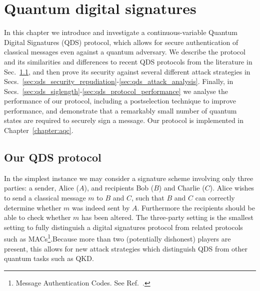 %

\chapter{Quantum digital signatures}


In this chapter we introduce and investigate a continuous-variable Quantum Digital Signatures (QDS) protocol, which allows for secure authentication of classical messages even against a quantum adversary. We describe the protocol and its similarities and differences to recent QDS protocols from the literature in Sec.~\ref{sec:qds_protocol}, and then prove its security against several different attack strategies in Secs.~\ref{sec:qds_security_repudiation}-\ref{sec:qds_attack_analysis}. Finally, in Secs.~\ref{sec:qds_siglength}-\ref{sec:qds_protocol_performance} we analyse the performance of our protocol, including a postselection technique to improve performance, and demonstrate that a remarkably small number of quantum states are required to securely sign a message. Our protocol is implemented in Chapter~\ref{chapter:aqc}.

\section{Our QDS protocol}\label{sec:qds_protocol}

In the simplest instance we may consider a signature scheme involving only three parties: a sender, Alice ($A$), and recipients Bob ($B$) and Charlie ($C$). Alice wishes to send a classical message $m$ to $B$ and $C$, such that $B$ and $C$ can correctly determine whether $m$ was indeed sent by $A$. Furthermore the recipients should be able to check whether $m$ has been altered. The three-party setting is the smallest setting to fully distinguish a digital signatures protocol from related protocols such as MACs\footnote{Message Authentication Codes. See Ref.~\cite{Schneier1996}.}.Because more than two (potentially dishonest) players are present, this allows for new attack strategies which distinguish QDS from other quantum tasks such as QKD.


